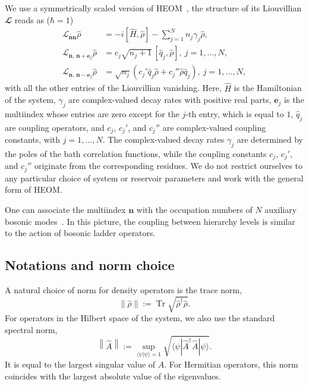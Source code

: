 \documentclass{SciPost}
\begin{document}
We use a symmetrically scaled version of HEOM~\cite{Shi2009, Zhu2011}, the structure of its Liouvillian $\mathbfcal L$ reads as (\(\hbar = 1\))
\begin{equation}
    \begin{aligned}
        \mathcal L_{\bm n \bm n}\hat \rho
        &=
        -i \left[\hat H, \hat \rho\right]
        - \sum\limits_{j=1}^N n_j \gamma_j \hat \rho, \\
        \mathcal L_{\bm n,\, \bm n + \bm e_j}\hat \rho
        &=
        c_j \sqrt{n_j + 1}\, \left[\hat q_j, \hat \rho\right],~j = 1,\ldots, N, \\
        \mathcal L_{\bm n,\, \bm n - \bm e_j}\hat \rho
        &=
        \sqrt{n_j} \left(
        c_j' \hat q_j \hat \rho + c_j'' \hat \rho \hat q_j
        \right),~j = 1,\ldots, N,
    \end{aligned}
    \label{eq:HEOM}
\end{equation}
with all the other entries of the Liouvillian vanishing.
Here, \(\hat H\) is the Hamiltonian of the system, \(\gamma_j\) are complex-valued decay rates with positive real parts, \(\bm e_j\) is the multiindex whose entries are zero except for the \(j\)-th entry, which is equal to \(1\), \(\hat q_j\) are coupling operators, and \(c_j\), \(c_j'\), and \(c_j''\) are complex-valued coupling constants, with \(j = 1, \ldots, N\). The complex-valued decay rates \(\gamma_j\) are determined by the poles of the bath correlation functions, while the coupling constants \(c_j\), \(c_j'\), and \(c_j''\) originate from the corresponding residues. We do not restrict ourselves to any particular choice of system or reservoir parameters and work with the general form of HEOM.

One can associate the multiindex \(\bm n\) with the occupation numbers of \(N\) auxiliary bosonic modes~\cite{Xu2023, Li2024, Chen2024a, Vadimov2025, Xu2026a}. In this picture, the coupling between hierarchy levels is similar to the action of bosonic ladder operators.

\subsection{Notations and norm choice}

A natural choice of norm for density operators is the trace norm,
\begin{equation}
    \|\hat \rho \| := \operatorname{Tr} \sqrt{\hat \rho^\dagger \hat \rho}.
\end{equation}
For operators in the Hilbert space of the system, we also use the standard spectral norm,
\begin{equation}
    \left \| \hat A \right \|
    :=
    \sup\limits_{\langle \psi | \psi \rangle = 1}
    \sqrt{\langle \psi | \hat A^\dagger \hat A | \psi \rangle }.
\end{equation}
It is equal to the largest singular value of \(\hat A\). For Hermitian operators, this norm coincides with the largest absolute value of the eigenvalues.
\end{document}
